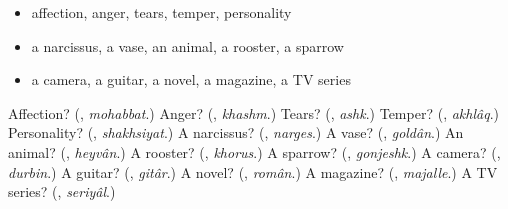 \begin{itemize}
\raggedright
  \item affection, anger, tears, temper, personality
  \item a narcissus, a vase, an animal, a rooster, a sparrow
  \item a camera, a guitar, a novel, a magazine, a TV series
\end{itemize}

\begin{tcolorbox}[breakable,colback=teal!4,colframe=teal!35!black,title={Before you move on}]
Affection? (\textbf{}, \emph{mohabbat}.) Anger? (\textbf{}, \emph{khashm}.) Tears? (\textbf{}, \emph{ashk}.) Temper? (\textbf{}, \emph{akhlâq}.) Personality? (\textbf{}, \emph{shakhsiyat}.) A narcissus? (\textbf{}, \emph{narges}.) A vase? (\textbf{}, \emph{goldân}.) An animal? (\textbf{}, \emph{heyvân}.) A rooster? (\textbf{}, \emph{khorus}.) A sparrow? (\textbf{}, \emph{gonjeshk}.) A camera? (\textbf{}, \emph{durbin}.) A guitar? (\textbf{}, \emph{gitâr}.) A novel? (\textbf{}, \emph{român}.) A magazine? (\textbf{}, \emph{majalle}.) A TV series? (\textbf{}, \emph{seriyâl}.)
\end{tcolorbox}
